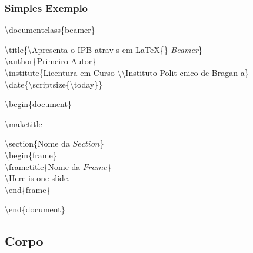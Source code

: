 \documentclass{article}
\begin{document}
\begin{frame}
\frametitle{Simples Exemplo}
\scriptsize{
\textbackslash documentclass\{beamer\}\\ \vspace{0.1cm}

\textbackslash title\{\textbackslash Apresenta o IPB atrav s em \LaTeX\{\} \emph{Beamer}\} \\
\textbackslash author\{Primeiro Autor\}\\
\textbackslash institute\{Licentura em Curso \textbackslash\textbackslash Instituto Polit cnico de Bragan a\}\\
\textbackslash date\{\textbackslash scriptsize\{\textbackslash today\}\}
 \\ \vspace{0.3cm}

\textbackslash begin\{document\} \\ \vspace{0.1cm}

\hspace{0.5cm}\textbackslash maketitle\\ \vspace{0.1cm}

\hspace{0.5cm}\textbackslash section\{Nome da $Section$\}\\
\hspace{0.5cm}\textbackslash begin\{frame\}\\
\hspace{1cm}\textbackslash frametitle\{Nome da $Frame$\}\\
\hspace{1cm}\textbackslash Here is one slide.\\
\hspace{0.5cm}\textbackslash end\{frame\}\\ \vspace{0.1cm}

\textbackslash end\{document\}\\
}

\end{frame}


\subsection{Corpo}
\end{document}
